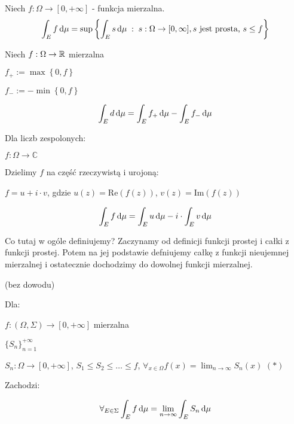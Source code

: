 \begin{definition}
    Niech \( f: \Omega\to [0, +\infty] \) - funkcja mierzalna.
    \[
        \int_E f \mathop{}\!\mathrm{d} \mu = \sup \left\{\int_E s \mathop{}\!\mathrm{d} \mu \; : \; s: \Omega\to [0, \infty], s \text{ jest prosta, } s \leq f \right\}
    \]
\end{definition}

\begin{definition}
    Niech  \( f: \Omega\to \mathbb{R} \) mierzalna

    \( f_+ := \max \left\{0, f\right\} \)

    \( f_- := -\min \left\{0, f\right\} \)

    \[
        \int_E d \mathop{}\!\mathrm{d} \mu = \int_E f_+ \mathop{}\!\mathrm{d} \mu - \int_E f_- \mathop{}\!\mathrm{d} \mu
    \]
\end{definition}

\begin{definition}
    Dla liczb zespolonych:

    \( f: \Omega\to \mathbb{C} \)

    Dzielimy \( f \) na część rzeczywistą i urojoną:

    \( f = u + i \cdot v \), gdzie \( u\left( z \right) = \text{Re}\left( f\left( z \right) \right) \), \( v\left( z \right) = \text{Im}\left( f\left( z \right) \right) \)

    \[
        \int_E f \mathop{}\!\mathrm{d} \mu = \int_E u \mathop{}\!\mathrm{d} \mu - i \cdot \int_E v \mathop{}\!\mathrm{d} \mu
    \]
\end{definition}

Co tutaj w ogóle definiujemy? Zaczynamy od definicji funkcji prostej i całki z funkcji prostej. Potem na jej podstawie defniujemy całkę z funkcji nieujemnej mierzalnej i ostatecznie dochodzimy do dowolnej funkcji mierzalnej.

\begin{theorem} (bez dowodu)

    Dla:

    \( f: \left( \Omega, \Sigma \right) \to [0, +\infty] \) mierzalna

    \( \{S_n\}_{n = 1}^{+\infty} \)

    \( S_n : \Omega \to [0, +\infty] \), \( S_1 \leq S_2 \leq \ldots \leq f \), \( \forall_{x \in \Omega} f(x) = \lim_{n \to \infty} S_n(x) \) \hfill \( (*) \)
    
    Zachodzi:

    \[
        \forall_{E \in \Sigma} \int_E f \mathop{}\!\mathrm{d} \mu = \lim_{n \to \infty} \int_E S_n \mathop{}\!\mathrm{d} \mu
    \]
\end{theorem}


